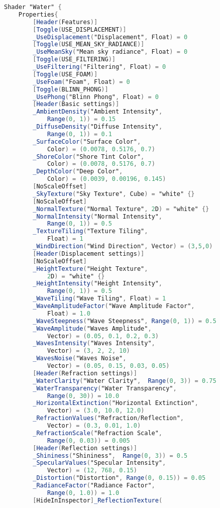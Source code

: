 \label{an:codigo-fonte-agua-unity}



\begin{lstlisting}[language=GLSL, caption={\label{cf:agua} \textit{Shader} de efeito de água na Unity}]
Shader "Water" {
	Properties{
		[Header(Features)]
		[Toggle(USE_DISPLACEMENT)] 
		_UseDisplacement("Displacement", Float) = 0
		[Toggle(USE_MEAN_SKY_RADIANCE)] 
		_UseMeanSky("Mean sky radiance", Float) = 0
		[Toggle(USE_FILTERING)] 
		_UseFiltering("Filtering", Float) = 0
		[Toggle(USE_FOAM)]
		_UseFoam("Foam", Float) = 0
		[Toggle(BLINN_PHONG)] 
		_UsePhong("Blinn Phong", Float) = 0
		[Header(Basic settings)]
		_AmbientDensity("Ambient Intensity",  
			Range(0, 1)) = 0.15
		_DiffuseDensity("Diffuse Intensity",  
			Range(0, 1)) = 0.1
		_SurfaceColor("Surface Color", 
			Color) = (0.0078, 0.5176, 0.7)
		_ShoreColor("Shore Tint Color", 
			Color) = (0.0078, 0.5176, 0.7)
		_DepthColor("Deep Color", 
			Color) = (0.0039, 0.00196, 0.145)
		[NoScaleOffset]
		_SkyTexture("Sky Texture", Cube) = "white" {}
		[NoScaleOffset]
		_NormalTexture("Normal Texture", 2D) = "white" {}
		_NormalIntensity("Normal Intensity",  
			Range(0, 1)) = 0.5
		_TextureTiling("Texture Tiling", 
			Float) = 1
		_WindDirection("Wind Direction", Vector) = (3,5,0)
		[Header(Displacement settings)]
		[NoScaleOffset]
		_HeightTexture("Height Texture", 
			2D) = "white" {}
		_HeightIntensity("Height Intensity",  
			Range(0, 1)) = 0.5
		_WaveTiling("Wave Tiling", Float) = 1
		_WaveAmplitudeFactor("Wave Amplitude Factor",
			Float) = 1.0
		_WaveSteepness("Wave Steepness", Range(0, 1)) = 0.5
		_WaveAmplitude("Waves Amplitude", 
			Vector) = (0.05, 0.1, 0.2, 0.3)
		_WavesIntensity("Waves Intensity", 
			Vector) = (3, 2, 2, 10)
		_WavesNoise("Waves Noise", 
			Vector) = (0.05, 0.15, 0.03, 0.05)
		[Header(Refraction settings)]
		_WaterClarity("Water Clarity",  Range(0, 3)) = 0.75
		_WaterTransparency("Water Transparency",  
			Range(0, 30)) = 10.0
		_HorizontalExtinction("Horizontal Extinction", 
			Vector) = (3.0, 10.0, 12.0)
		_RefractionValues("Refraction/Reflection", 
			Vector) = (0.3, 0.01, 1.0)
		_RefractionScale("Refraction Scale",  
			Range(0, 0.03)) = 0.005
		[Header(Reflection settings)]
		_Shininess("Shininess",  Range(0, 3)) = 0.5
		_SpecularValues("Specular Intensity", 
			Vector) = (12, 768, 0.15)
		_Distortion("Distortion", Range(0, 0.15)) = 0.05
		_RadianceFactor("Radiance Factor", 
			Range(0, 1.0)) = 1.0
		[HideInInspector]_ReflectionTexture(

\end{lstlisting}
